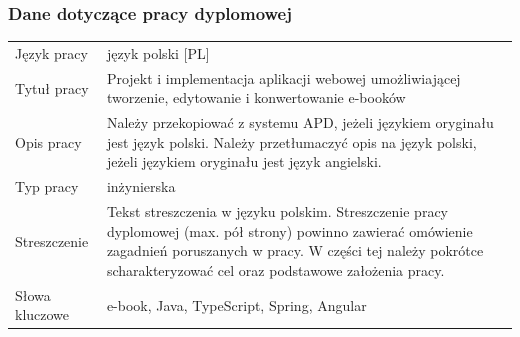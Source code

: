 \subsubsection*{Dane dotyczące pracy dyplomowej}
\begin{tabular}{p{3cm}p{12cm}}
Język pracy & język polski [PL] \\
Tytuł pracy  & Projekt i implementacja aplikacji webowej umożliwiającej tworzenie, edytowanie i konwertowanie e-booków\\
Opis pracy & Należy przekopiować z systemu APD, jeżeli językiem oryginału jest język polski. Należy przetłumaczyć opis na język polski, jeżeli językiem oryginału jest język angielski.\\
Typ pracy & inżynierska\\
Streszczenie  & Tekst streszczenia w języku polskim. Streszczenie pracy dyplomowej (max. pół strony) powinno zawierać omówienie zagadnień poruszanych w pracy. W części tej należy pokrótce scharakteryzować cel oraz podstawowe założenia pracy.\\
Słowa kluczowe & e-book, Java, TypeScript, Spring, Angular \\
\end{tabular}





